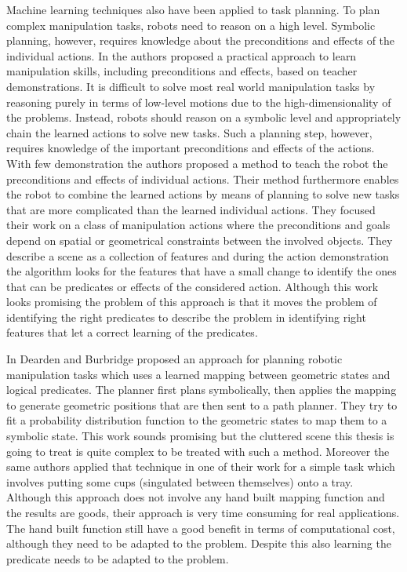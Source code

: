 Machine learning techniques also have been applied to task planning. To plan complex manipulation tasks,
robots need to reason on a high level. Symbolic planning, however, requires knowledge about the preconditions and effects
of the individual actions. 
In \citep{abdo2013learning} the authors proposed a practical
approach to learn manipulation skills, including preconditions
and effects, based on teacher demonstrations.
It is difficult to solve most real world manipulation tasks by reasoning purely in terms of low-level motions due to the high-dimensionality of the problems. Instead, robots should reason on a symbolic level and appropriately chain the learned actions to solve new tasks.  Such a planning step, however, requires knowledge of the important preconditions and effects of the actions.
With few demonstration the authors proposed a method to teach the robot the preconditions and effects of individual actions. Their method furthermore enables the robot to combine the learned actions by means of planning to solve new tasks that are more complicated than the learned individual actions. 
They focused their work on a class of manipulation actions where the preconditions and goals depend on spatial or geometrical constraints between the involved objects. They describe a scene as a collection of features and during the action demonstration the algorithm looks for the features that have a small change to identify the ones that can be predicates or effects of the considered action. 
Although this work looks promising the problem of this approach is that it moves the problem of identifying the right predicates to describe the problem in identifying right features that let a correct learning of the predicates. %

In \citep{Dearden2014355} Dearden and Burbridge proposed an approach for planning robotic manipulation tasks which uses a learned mapping between geometric states and logical predicates. The planner first plans symbolically, then applies the mapping to generate geometric positions that are then sent to a path planner. They try to fit a probability distribution function to the geometric states to map them to a symbolic state. This work sounds promising but the cluttered scene this thesis is going to treat is quite complex to be treated with such a method. Moreover the same authors applied that technique in one of their work \citep{dearden2013approach} for a simple task which involves putting some cups (singulated between themselves) onto a tray. Although this approach does not involve any hand built mapping function and the results are goods, their approach is very time consuming for real applications. The hand built function still have a good benefit in terms of computational cost, although they need to be adapted to the problem. Despite this also learning the predicate needs to be adapted to the problem. 


